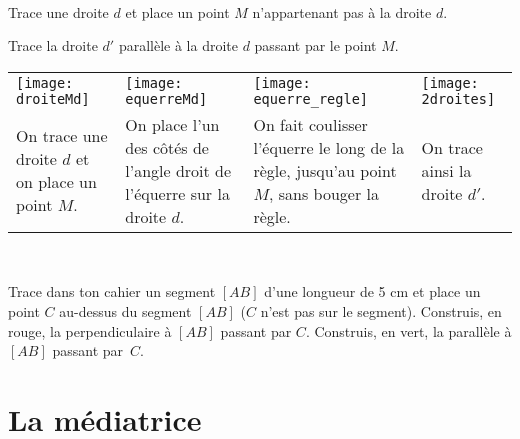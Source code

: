 
\begin{methode*1}

\begin{exemple*1}  \\[0.75em]
Trace une droite $d$ et place un point $M$ n'appartenant pas à la droite $d$. 

Trace la droite $d'$ parallèle à la droite $d$ passant par le point $M$. \\[0.5em]

\begin{tabularx}{\textwidth}{X|X|X|X}
 \texttt{[image: droiteMd]} &  \texttt{[image: equerreMd]} & \texttt{[image: equerre\_regle]} &  \texttt{[image: 2droites]}\\ 
On trace une droite $d$ et on place un point $M$. & On place l'un des côtés de l'angle droit de l'équerre sur la droite $d$. & On fait coulisser l'équerre le long de la règle, jusqu'au point $M$, sans bouger la règle. & On trace ainsi la droite $d'$.\\
\end{tabularx} \\
 
 \end{exemple*1}

\exercice 
Trace dans ton cahier un segment $[AB]$ d'une longueur de 5 cm et place un point $C$ au-dessus du segment $[AB]$ ($C$ n'est pas sur le segment). Construis, en rouge, la perpendiculaire à $[AB]$ passant par $C$. Construis, en vert, la parallèle à $[AB]$ passant par $C$.


\end{methode*1}

\section{La médiatrice}

